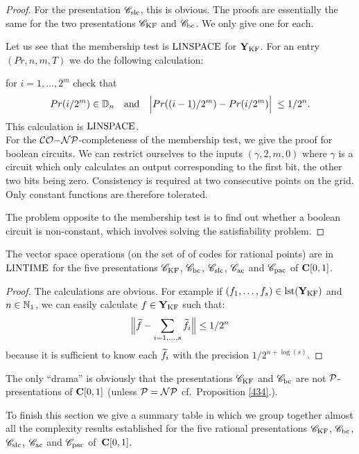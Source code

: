 \begin{proof}
For the presentation ${{{\mathscr C}}_{\rm slc}}$, this is obvious. The proofs are essentially the same for the two presentations ${{{\mathscr C}}_{\rm KF}}$ and ${{{\mathscr C}}_{\rm bc}}$. 
We only give one for each.

\noindent 
Let us see that the membership test is ${\rm LINSPACE}$ for ${{\bf Y}_{\rm KF}}$. 
For an entry $(Pr,n,m,T)$ we do the following calculation: 

\noindent 
 for $i = 1,\ldots,2^m$ check that
\[
Pr(i/2^m) \in \mathbb {D}_n \quad  {\rm and} \quad  \Big|{ Pr((i-1)/2^m) - Pr(i/2^m) }\Big|\;  
\leq 1/2^n.
\]
This calculation is ${\rm LINSPACE}$.\\
For the ${\cal CO}{\rm-}{\cal NP}$-completeness of the membership test, we give the proof for boolean circuits. We can restrict ourselves to the inputs $(\gamma,2,m,0)$ where $\gamma$ is a circuit which only calculates an output corresponding to the first bit, the other two bits being zero. Consistency is required at two consecutive points on the grid. Only constant functions are therefore tolerated.

\noindent 
The problem opposite to the membership test is to find out whether a boolean circuit is non-constant, which involves solving the satisfiability problem. 
\end{proof}


\begin{proposition} \label{442}
 The vector space operations (on the set of of codes for rational points) are in ${\rm LINTIME}$ for the five presentations ${{{\mathscr C}}_{\rm KF}}$, ${{{\mathscr C}}_{\rm bc}}$, ${{{\mathscr C}}_{\rm slc}}$, ${{{\mathscr C}}_{\rm ac}}$ and ${{{\mathscr C}}_{\rm pac}}$ of ${{\bf C}[0,1]}$.
\end{proposition} 
%
\begin{proof}
The calculations are obvious. For example if $(f_1,\ldots,f_s) \in {\rm lst}({{\bf Y}_{\rm KF}} )$ and $n \in \mathbb {N}_1$, we can easily calculate $f \in {{\bf Y}_{\rm KF}} $ such that: 
\[
\Big\lVert  \widetilde{f} - \sum_{i=1,\ldots,s} \widetilde{f_i}  \Big\rVert \leq 
1/2^n
\] 
because it is sufficient to know each $\widetilde{f_i}$ with the precision $1/2^{n+\log(s)}$. 
\end{proof}



The only ``drama'' is obviously that the presentations ${{{\mathscr C}}_{\rm KF}}$ and ${{{\mathscr C}}_{\rm bc}}$ are not ${\cal P}$-presentations of ${{\bf C}[0,1]}$ (unless ${\cal P} = {\cal NP}$ cf.\ Proposition \ref{434}.). 

 
To finish this section we give a summary table in which we group together almost all the complexity results established for the five rational presentations ${{{\mathscr C}}_{\rm KF}}$, ${{{\mathscr C}}_{\rm bc}}$, ${{{\mathscr C}}_{\rm slc}}$, ${{{\mathscr C}}_{\rm ac}}$ and ${{{\mathscr C}}_{\rm pac}}$ of~${{\bf C}[0,1]}$.


